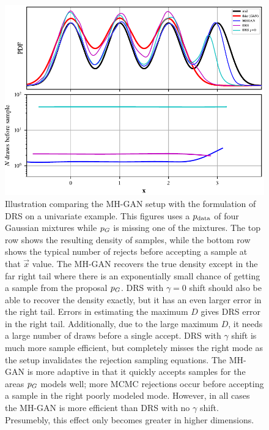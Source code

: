 \begin{figure}[htbp]
    \centering
    \includegraphics[scale=1.0]{figures/univariate_example.pdf}
    \caption{{\small
    Illustration comparing the MH-GAN setup with the formulation of DRS on a univariate example.
    This figures uses a ${p_{\textrm{data}}}$ of four Gaussian mixtures while ${p_G}$ is missing one of the mixtures.
    The top row shows the resulting density of samples, while the bottom row shows the typical number of rejects before accepting a sample at that $\vec x$ value.
    The MH-GAN recovers the true density except in the far right tail where there is an exponentially small chance of getting a sample from the proposal ${p_G}$.
    DRS with $\gamma=0$ shift should also be able to recover the density exactly, but it has an even larger error in the right tail.
    Errors in estimating the maximum $D$ gives DRS error in the right tail.
    Additionally, due to the large maximum $D$, it needs a large number of draws before a single accept.
    DRS with $\gamma$ shift is much more sample efficient, but completely misses the right mode as the setup invalidates the rejection sampling equations.
    The MH-GAN is more adaptive in that it quickly accepts samples for the areas ${p_G}$ models well; more MCMC rejections occur before accepting a sample in the right poorly modeled mode.
    However, in all cases the MH-GAN is more efficient than DRS with no $\gamma$ shift.
    Presumebly, this effect only becomes greater in higher dimensions.
    }}
    \label{fig:univariate_example}
\end{figure}

